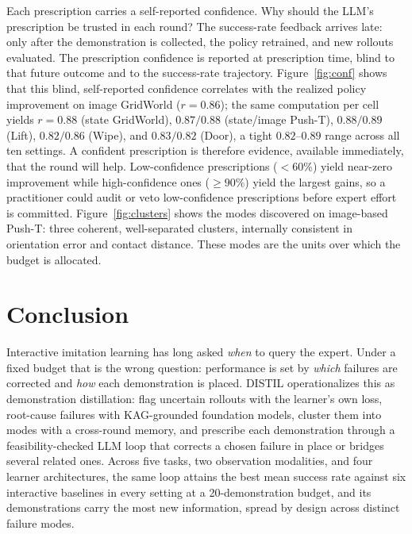 \documentclass[letterpaper]{article} %
\begin{document}
Each prescription carries a self-reported confidence. Why should the
LLM's prescription be trusted in each round? The success-rate feedback
arrives late: only after the demonstration is collected, the policy
retrained, and new rollouts evaluated. The prescription confidence is
reported at prescription time, blind to that future outcome and to the
success-rate trajectory. Figure~\ref{fig:conf} shows that this blind,
self-reported confidence correlates with the realized policy improvement on
image GridWorld ($r=0.86$); the same computation per cell yields $r=0.88$
(state GridWorld), $0.87/0.88$ (state/image Push-T), $0.88/0.89$ (Lift),
$0.82/0.86$ (Wipe), and $0.83/0.82$ (Door), a tight $0.82$--$0.89$ range
across all ten settings. A confident prescription is therefore evidence,
available immediately, that the round will help. Low-confidence
prescriptions ($<60\%$) yield near-zero improvement while high-confidence
ones ($\ge 90\%$) yield the largest gains, so a practitioner could audit or
veto low-confidence prescriptions before expert effort is committed.
Figure~\ref{fig:clusters} shows the modes discovered on image-based Push-T:
three coherent, well-separated clusters, internally consistent in
orientation error and contact distance. These modes are the units over
which the budget is allocated.

\section{Conclusion}
\label{sec:conclusion}

Interactive imitation learning has long asked \emph{when} to query the
expert. Under a fixed budget that is the wrong question: performance is set
by \emph{which} failures are corrected and \emph{how} each demonstration is
placed. DISTIL operationalizes this as demonstration distillation: flag
uncertain rollouts with the learner's own loss, root-cause failures with
KAG-grounded foundation models, cluster them into modes with a cross-round
memory, and prescribe each demonstration through a feasibility-checked LLM
loop that corrects a chosen failure in place or bridges several related
ones. Across five tasks, two
observation modalities, and four learner architectures, the same loop attains
the best mean success rate against six interactive baselines in every setting
at a 20-demonstration budget, and its demonstrations carry the most new
information, spread by design across distinct failure modes.
\end{document}
